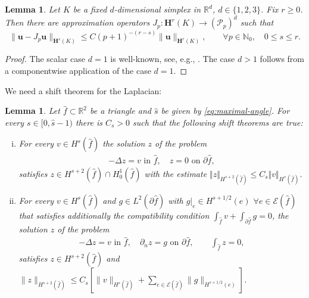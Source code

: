 \documentclass{article}
\newtheorem{lemma}[theorem]{Lemma}
\begin{document}
\begin{lemma}
\label{lemma:Pgrad1d} 
Let $K$ be a fixed $d$-dimensional simplex in ${\mathbb R}^d$, $d \in \{1,2,3\}$. 
Fix $r \ge 0$. 
Then there are approximation operators $J_p:\mathbf{H}^r(K) \rightarrow ({\mathcal P}_p)^d$
such that 
$$
\|{\mathbf u} - J_p {\mathbf u}\|_{\mathbf{H}^s(K)} \leq C (p+1)^{-(r-s)} \|{\mathbf u}\|_{\mathbf{H}^r(K)}, 
\qquad \forall p \in {\mathbb N}_0, \quad 0 \leq s \leq r. 
$$
\end{lemma}

\begin{proof}
The scalar case $d = 1$ is well-known, see, e.g., \cite[Thm.~{5.1}]{melenk_nshpinterpolation_article}. 
The case $d > 1$ follows from a componentwise application of the case $d = 1$. 
\end{proof}

We need a shift theorem for the Laplacian: 
\begin{lemma}
\label{lemma:shift-theorem}
Let $\widehat f \subset {\mathbb R}^2$ be a triangle and $\widehat{s}$ be given by 
\eqref{eq:maximal-angle}.
For every $s \in [0,\widehat{s}-1)$ there is $C_s > 0$ such that the following shift theorems are true:
\begin{enumerate}[(i)]
\item For every $v\in H^s(\widehat{f})$ the solution $z$ of the problem
\begin{align*}
-\Delta z=v \text{ in } \widehat{f}, \quad z=0 \text{ on } \partial\widehat{f}, 
\end{align*}
satisfies $z\in H^{s+2}(\widehat{f}) \cap H_0^1(\widehat{f})$ 
with the estimate $\Vert z\Vert_{H^{s+2}(\widehat{f})} \leq C_s \Vert v\Vert_{H^s(\widehat{f})}$.
\item For every $v\in H^s(\widehat{f})$ and 
$g \in L^2(\partial\widehat f)$ with 
$g|_{e} \in H^{s+1/2}(e)$ $\forall e \in {\mathcal E}(\widehat f)$ that satisfies additionally the compatibility
condition $\int_{\widehat f} v + \int_{\partial \widehat f} g = 0$, the solution $z$ of the problem
\begin{align*}
-\Delta z=v \text{ in } \widehat{f}, \quad \partial_n z=g \text{ on } \partial\widehat{f}, 
\qquad \int_{\widehat f} z = 0, 
\end{align*}
satisfies $z \in H^{s+2}(\widehat f)$ and 
$\|z\|_{H^{s+2}(\widehat f)} \leq C_s \left[ \|v\|_{H^s(\widehat f)} + \sum_{e \in {\mathcal E}(\widehat f)} 
\|g\|_{H^{s+1/2}(e)}\right]$. 
\end{enumerate}
\end{lemma}
\end{document}
